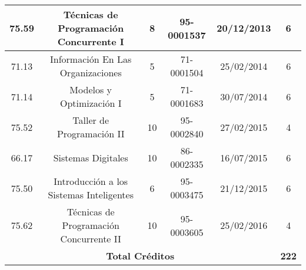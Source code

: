 {\begin{center}
\begin{tabular}{|c|c|c|c|c|c|}
            \hline
            75.59 & Técnicas de Programación Concurrente I   & 8  & 95-0001537 & 20/12/2013 & 6 \\
            \hline
            71.13 & Información En Las Organizaciones        & 5  & 71-0001504 & 25/02/2014 & 6 \\
            \hline
            71.14 & Modelos y Optimización I                 & 5  & 71-0001683 & 30/07/2014 & 6 \\
            \hline
            75.52 & Taller de Programación II                & 10 & 95-0002840 & 27/02/2015 & 4 \\
            \hline
            66.17 & Sistemas Digitales                       & 10 & 86-0002335 & 16/07/2015 & 6 \\
            \hline
            75.50 & Introducción a los Sistemas Inteligentes & 6  & 95-0003475 & 21/12/2015 & 6 \\
            \hline
            75.62 & Técnicas de Programación Concurrente II  & 10 & 95-0003605 & 25/02/2016 & 4 \\
            \hline
            \multicolumn{5}{|c|}{\textbf{Total Créditos}} & \textbf{222} \\
            \hline
        \end{tabular}
        \end{center}
    }
